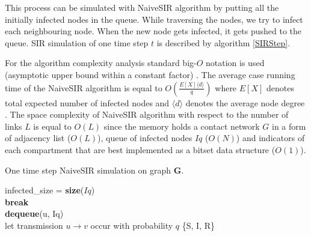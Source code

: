 \documentclass[times, utf8, diplomski]{fer}
\begin{document}
This process can be simulated with NaiveSIR algorithm  \cite{NaiveSIR} by putting all the initially infected nodes in the queue. While traversing the nodes, we try to infect each neighbouring node. When the new node gets infected, it gets pushed to the queue. SIR simulation of one time step $t$ is described by algorithm \ref{SIRStep}.

For the algorithm complexity analysis standard big-$O$ notation is used (asymptotic upper bound within a constant factor) \cite{Graham:1994:CMF:562056}. The average  case running time of the NaiveSIR algorithm is equal to $O(\frac{E[X]\langle d \rangle}{q})$ where $E[X]$ denotes total expected number of infected nodes and $\langle d \rangle$ denotes the average node degree \cite{NaiveSIR}. 
The space complexity of NaiveSIR algorithm with respect to the number of links $L$ is equal to $O(L)$ since the memory holds a contact network $G$ in a form of adjacency list ($O(L)$), queue of infected nodes $Iq$ ($O(N)$) and indicators of each compartment that are best implemented as a bitset data structure ($O(1)$). 

\begin{algorithm}
 \caption{One time step NaiveSIR simulation on graph $\mathbf{G}$.}
 \label{SIRStep}
 infected\_size = \textbf{size}($Iq$)\\
  {
  {
 \textbf{break}\\
 }
 \textbf{dequeue}(u, Iq)\\
  let transmission $u \rightarrow v$ occur with probability  $q$\;
  }
  \Return \{S, I, R\}
\end{algorithm}
\end{document}
